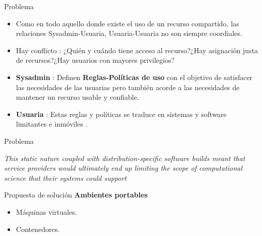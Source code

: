 \documentclass[11pt]{beamer}
\begin{document}
\begin{frame}{Problema}

	\begin{itemize}
		\item Como en todo aquello donde existe el uso de un recurso compartido, las relaciones Sysadmin-Usuaria, Usuaria-Usuaria no son siempre coordiales. 
		\item Hay conflicto : ¿Quién y cuándo tiene acceso al recurso?¿Hay asignación justa de recursos?¿Hay usuarios con mayores privilegios?
		\item \textbf{Sysadmin} : Definen \textbf{Reglas-Políticas de uso} con el objetivo de satisfacer las necesidades de las usuarias pero también acorde a las necesidades de mantener un recurso usable y confiable.
		\item \textbf{Usuaria} : Estas reglas y políticas se traduce en sistemas y software limitantes e inmóviles \citep{kurtzer2017singularity}. 
	\end{itemize}

\end{frame}

\begin{frame}{Problema}

	\begin{center}
		\textit{This static nature coupled with distribution-specific software builds meant that service providers would ultimately end up limiting the scope of computational science that their systems could support}\citep{kurtzer2017singularity}
	\end{center}

\end{frame}

\begin{frame}{Propuesta de solución\citep{kurtzer2017singularity}}
	\textbf{Ambientes portables}
	
	\begin{itemize}
		\item Máquinas virtuales.
		\item Contenedores.
	\end{itemize}
\end{frame}
\end{document}
